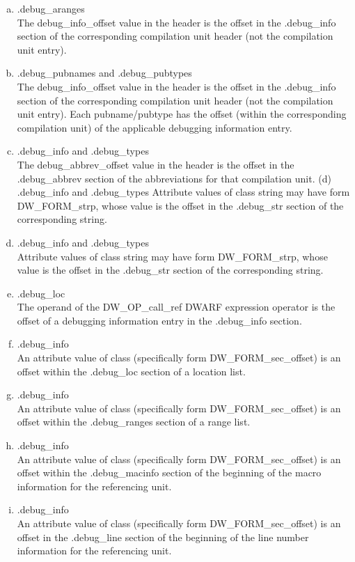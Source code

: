 \clearpage
\begin{enumerate}[(a)]  
\item  .debug\_aranges  \\
The debug\_info\_offset value in
the header is the offset in the .debug\_info section of the
corresponding compilation unit header (not the compilation
unit entry).

\item .debug\_pubnames and .debug\_pubtypes \\
The debug\_info\_offset value in the header is the offset in the
.debug\_info section of the corresponding compilation unit header (not
the compilation unit entry). Each pubname/pubtype has the offset (within
the corresponding compilation unit) of the applicable debugging
information entry.

\item .debug\_info and .debug\_types \\
The debug\_abbrev\_offset value in the header is the offset in the
.debug\_abbrev section of the abbreviations for that compilation unit.
(d) .debug\_info and .debug\_types
Attribute values of class string may have form DW\-\_FORM\-\_strp, whose
value is the offset in the .debug\_str section of the corresponding string.

\item  .debug\_info and .debug\_types \\
Attribute values of class string may have form DW\-\_FORM\-\_strp, whose
value is the offset in the .debug\_str section of the corresponding string.

\item .debug\_loc \\
The operand of the DW\-\_OP\-\_call\-\_ref DWARF expression operator is the
offset of a debugging information entry in the .debug\_info section.

\item .debug\_info \\
An attribute value of class  (specifically form
DW\-\_FORM\-\_sec\-\_offset) is an offset within the .debug\_loc section of a
location list.

\item .debug\_info \\
An attribute value of class  (specifically form
DW\-\_FORM\-\_sec\-\_offset) is an offset within the .debug\_ranges section of
a range list.


\item .debug\_info \\
An attribute value of class  (specifically form
DW\-\_FORM\-\_sec\-\_offset) is an offset within the .debug\_macinfo section
of the beginning of the macro information for the referencing unit.


\item .debug\_info \\
An attribute value of class  (specifically form
DW\-\_FORM\-\_sec\-\_offset) is an offset in the .debug\_line section of the
beginning of the line number information for the referencing unit.
\end{enumerate}



